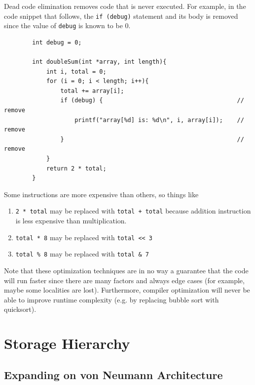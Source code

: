 \documentclass{article}
\begin{document}
    \begin{definition}
      Dead code elimination removes code that is never executed. For example, in the code snippet that follows, the \texttt{if (debug)} statement and its body is removed since the value of \texttt{debug} is known to be 0.
      \begin{lstlisting}
        int debug = 0;

        int doubleSum(int *array, int length){
            int i, total = 0;
            for (i = 0; i < length; i++){
                total += array[i];
                if (debug) {                                      // remove 
                    printf("array[%d] is: %d\n", i, array[i]);    // remove 
                }                                                 // remove
            }
            return 2 * total;
        }
      \end{lstlisting}
    \end{definition}

    \begin{definition}
      Some instructions are more expensive than others, so things like 
      \begin{enumerate}
        \item \texttt{2 * total} may be replaced with \texttt{total + total} because addition instruction is less expensive than multiplication. 
        \item \texttt{total * 8} may be replaced with \texttt{total << 3} 
        \item \texttt{total \% 8} may be replaced with \texttt{total \& 7}
      \end{enumerate}
    \end{definition}

    Note that these optimization techniques are in no way a guarantee that the code will run faster since there are many factors and always edge cases (for example, maybe some localities are lost). Furthermore, compiler optimization will never be able to improve runtime complexity (e.g. by replacing bubble sort with quicksort). 

\section{Storage Hierarchy}

  \subsection{Expanding on von Neumann Architecture} 
\end{document}
